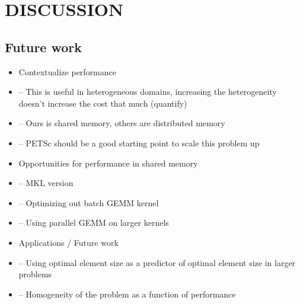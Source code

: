 \section{DISCUSSION}

\subsection{Future work}

\begin{itemize}
	\item Contextualize performance 
	\item -- This is useful in heterogeneous domains, increasing the heterogeneity doesn't increase the cost that much (quantify)
	\item -- Ours is shared memory, others are distributed memory 
	\item -- PETSc should be a good starting point to scale this problem up 
	\item Opportunities for performance in shared memory
	\item -- MKL version 
	\item -- Optimizing out batch GEMM kernel 
	\item -- Using parallel GEMM on larger kernels 
	\item Applications / Future work 
	\item -- Using optimal element size as a predictor of optimal element size in larger problems 
	\item -- Homogeneity of the problem as a function of performance 
\end{itemize}


